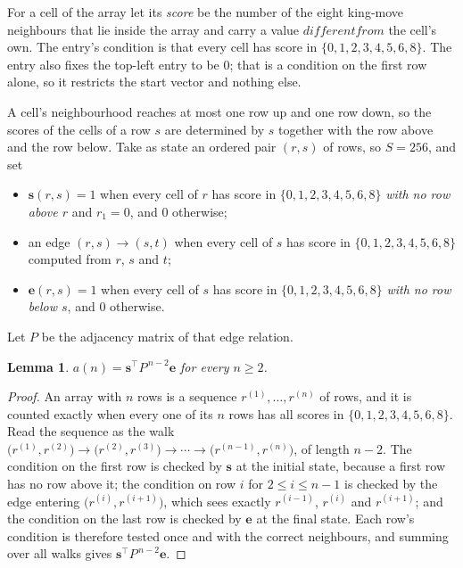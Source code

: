 \documentclass[11pt,a4paper]{article}
\theoremstyle{plain}
\newtheorem{lemma}[theorem]{Lemma}
\theoremstyle{definition}
\begin{document}
For a cell of the array let its \emph{score} be the number of the eight king-move neighbours that lie inside
the array and carry a value $different from$ the cell's own. The entry's condition is that every cell
has score in $\{0,1,2,3,4,5,6,8\}$. The entry also fixes the top-left entry to be $0$; that is a condition on the first row alone, so it restricts the start vector and nothing else.

A cell's neighbourhood reaches at most one row up and one row down, so the scores of the
cells of a row $s$ are determined by $s$ together with the row above and the row below.
Take as state an ordered pair $(r,s)$ of rows, so $S=256$, and set
\begin{itemize}
\item $\mathbf{s}(r,s)=1$ when every cell of $r$ has score in $\{0,1,2,3,4,5,6,8\}$ \emph{with no row
above $r$} and $r_1=0$, and $0$ otherwise;
\item an edge $(r,s)\to(s,t)$ when every cell of $s$ has score in $\{0,1,2,3,4,5,6,8\}$ computed from
$r$, $s$ and $t$;
\item $\mathbf{e}(r,s)=1$ when every cell of $s$ has score in $\{0,1,2,3,4,5,6,8\}$ \emph{with no row
below $s$}, and $0$ otherwise.
\end{itemize}
Let $P$ be the adjacency matrix of that edge relation.

\begin{lemma}\label{lem:walk}
$a(n)=\mathbf{s}^{\!\top}P^{\,n-2}\mathbf{e}$ for every $n\ge2$.
\end{lemma}

\begin{proof}
An array with $n$ rows is a sequence $r^{(1)},\dots,r^{(n)}$ of rows, and it is counted
exactly when every one of its $n$ rows has all scores in $\{0,1,2,3,4,5,6,8\}$. Read the sequence as the
walk $\bigl(r^{(1)},r^{(2)}\bigr)\to\bigl(r^{(2)},r^{(3)}\bigr)\to\cdots\to
\bigl(r^{(n-1)},r^{(n)}\bigr)$, of length $n-2$. The condition on the first row is
checked by $\mathbf{s}$ at the initial state, because a first row has no row above it; the
condition on row $i$ for $2\le i\le n-1$ is checked by the edge entering
$\bigl(r^{(i)},r^{(i+1)}\bigr)$, which sees exactly $r^{(i-1)}$, $r^{(i)}$ and
$r^{(i+1)}$; and the condition on the last row is checked by $\mathbf{e}$ at the final
state. Each row's condition is therefore tested once and with the correct neighbours, and
summing over all walks gives $\mathbf{s}^{\!\top}P^{\,n-2}\mathbf{e}$.
\end{proof}
\end{document}
